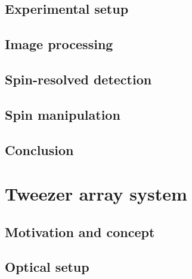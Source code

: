 \documentclass[twoside]{article}
\begin{document}
\subsection{Experimental setup} \label{subsec:imaging-setup}

\subsection{Image processing} \label{subsec:imaging-processing}

\subsection{Spin-resolved detection} \label{subsec:imaging-spin}

\subsection{Spin manipulation} \label{subsec:imaging-flip}


\subsection{Conclusion} \label{subsec:imaging-conclusion}



\newpage
\section{Tweezer array system} \label{sec:tweezer}

\subsection{Motivation and concept} \label{subsec:aodconcept}

\subsection{Optical setup}
\end{document}
